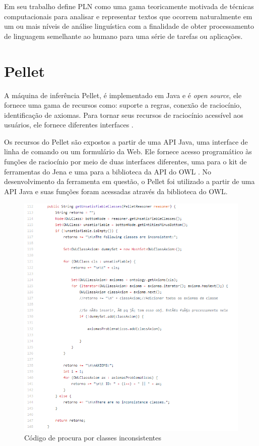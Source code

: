 \documentclass{bcc}
\begin{document}
Em seu trabalho \cite{liddy2001} define PLN como uma gama teoricamente motivada de técnicas computacionais para analisar e representar textos que ocorrem naturalmente em um ou mais níveis de análise linguística com a finalidade de obter processamento de linguagem semelhante ao humano para uma série de tarefas ou aplicações.

\section{Pellet}

A máquina de inferência Pellet, é implementado em Java e é \textit{open source}, ele fornece uma gama de recursos como: suporte a regras, conexão de raciocínio, identificação de axiomas. Para tornar seus recursos de raciocínio acessível aos usuários, ele fornece diferentes interfaces \cite{sirin2007}. 

Os recursos do Pellet são expostos a partir de uma API Java, uma interface de linha de comando ou um formulário da Web. Ele fornece acesso programático às funções de raciocínio por meio de duas interfaces diferentes, uma para o kit de ferramentas do Jena e uma para a biblioteca da API do OWL \cite{parsia2004}. No desenvolvimento da ferramenta em questão, o Pellet foi utilizado a partir de uma API Java e suas funções foram acessadas através da biblioteca do OWL. 

\begin{figure}[H]
\centering
\includegraphics[width=1\textwidth]{Figuras/pellet_inconsistencia.png}
\caption{Código de procura por classes inconsistentes}
\label{fig:pellet_inconsistencia}
\end{figure}
\end{document}
